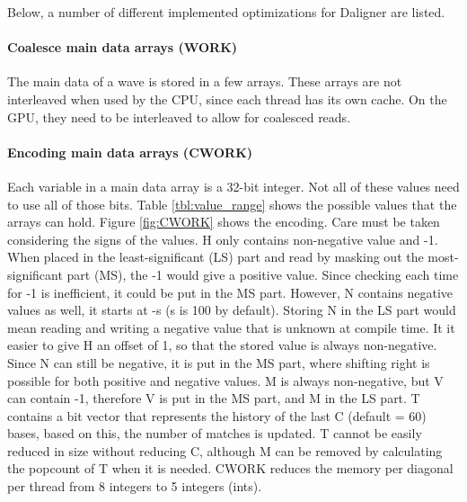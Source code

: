 \documentclass[../thesis.tex]{subfiles}
\begin{document}

Below, a number of different implemented optimizations for Daligner are listed.

\paragraph{Coalesce main data arrays (WORK)}
The main data of a wave is stored in a few arrays.
These arrays are not interleaved when used by the CPU, since each thread has its own cache.
On the GPU, they need to be interleaved to allow for coalesced reads.

\paragraph{Encoding main data arrays (CWORK)}
Each variable in a main data array is a 32-bit integer.
Not all of these values need to use all of those bits.
Table \ref{tbl:value_range} shows the possible values that the arrays can hold.
Figure \ref{fig:CWORK} shows the encoding.
Care must be taken considering the signs of the values.
H only contains non-negative value and -1.
When placed in the least-significant (LS) part and read by masking out the most-significant part (MS), the -1 would give a positive value.
Since checking each time for -1 is inefficient, it could be put in the MS part.
However, N contains negative values as well, it starts at -s (s is 100 by default).
Storing N in the LS part would mean reading and writing a negative value that is unknown at compile time.
It it easier to give H an offset of 1, so that the stored value is always non-negative.
Since N can still be negative, it is put in the MS part, where shifting right is possible for both positive and negative values.
M is always non-negative, but V can contain -1, therefore V is put in the MS part, and M in the LS part.
T contains a bit vector that represents the history of the last C (default = 60) bases, based on this, the number of matches is updated.
T cannot be easily reduced in size without reducing C, although M can be removed by calculating the popcount of T when it is needed.
CWORK reduces the memory per diagonal per thread from 8 integers to 5 integers (ints).
\end{document}
